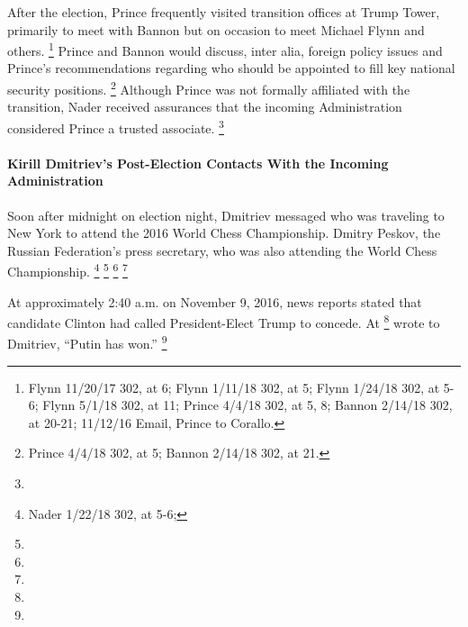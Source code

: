After the election, Prince frequently visited transition offices at Trump Tower, primarily to meet with Bannon but on occasion to meet Michael Flynn and others.%
\footnote{Flynn 11/20/17 302, at 6;
Flynn 1/11/18 302, at 5;
Flynn 1/24/18 302, at 5-6;
Flynn 5/1/18 302, at 11;
Prince 4/4/18 302, at 5, 8;
Bannon 2/14/18 302, at 20-21;
11/12/16 Email, Prince to Corallo.}
Prince and Bannon would discuss, inter alia, foreign policy issues and Prince's recommendations regarding who should be appointed to fill key national security positions.%
\footnote{Prince 4/4/18 302, at 5;
Bannon 2/14/18 302, at 21.}
Although Prince was not formally affiliated with the transition, Nader
received assurances
that the incoming Administration considered Prince a trusted associate.%
\footnote{}

\paragraph{Kirill Dmitriev's Post-Election Contacts With the Incoming Administration}

Soon after midnight on election night, Dmitriev messaged
who was traveling to New York to attend the 2016 World Chess Championship.
Dmitry Peskov, the Russian Federation's press secretary, who was also attending the World Chess Championship.%
\footnote{ Nader 1/22/18 302, at 5-6; }
\footnote{}
\footnote{}
\footnote{}

At approximately 2:40 a.m. on November 9, 2016, news reports stated that candidate Clinton had called President-Elect Trump to concede.
At
\footnote{}
wrote to Dmitriev, ``Putin has won.''%
\footnote{}

